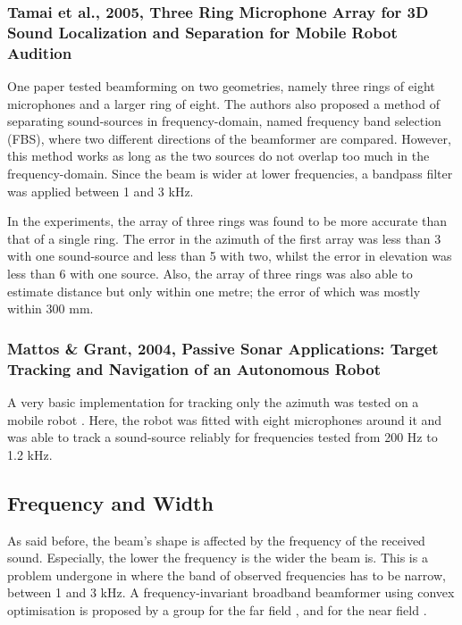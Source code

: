 \documentclass[notitlepage]{report}
\begin{document}
\subsubsection{Tamai et al., 2005, Three Ring Microphone Array for 3D Sound Localization and Separation for Mobile Robot Audition}

One paper \cite{tamai_three_2005} tested beamforming on two geometries, namely three rings of eight microphones and a larger ring of eight. The authors also proposed a method of separating sound-sources in frequency-domain, named frequency band selection (FBS), where two different directions of the beamformer are compared. However, this method works as long as the two sources do not overlap too much in the frequency-domain. Since the beam is wider at lower frequencies, a bandpass filter was applied between 1 and 3 \si{kHz}. 

In the experiments, the array of three rings was found to be more accurate than that of a single ring. The error in the azimuth of the first array was less than 3 \si{\deg} with one sound-source and less than 5 \si{\deg} with two, whilst the error in elevation was less than 6 \si{\deg} with one source. Also, the array of three rings was also able to estimate distance but only within one metre; the error of which was mostly within 300 \si{mm}.

\subsubsection{Mattos \& Grant, 2004, Passive Sonar Applications: Target Tracking and Navigation of an Autonomous Robot}

A very basic implementation for tracking only the azimuth was tested on a mobile robot \cite{mattos_passive_2004}. Here, the robot was fitted with eight microphones around it and was able to track a sound-source reliably for frequencies tested from 200 \si{Hz} to 1.2 \si{kHz}.

\subsection{Frequency and Width}

As said before, the beam's shape is affected by the frequency of the received sound. Especially, the lower the frequency is the wider the beam is. This is a problem undergone in \cite{tamai_three_2005} where the band of observed frequencies has to be narrow, between 1 and 3 \si{kHz}. A frequency-invariant broadband beamformer using convex optimisation is proposed by a group for the far field \cite{argentieri_experimental_2005}, \cite{argentieri_prototyping_2005} and for the near field \cite{argentieri_modal_2006}.
\end{document}

